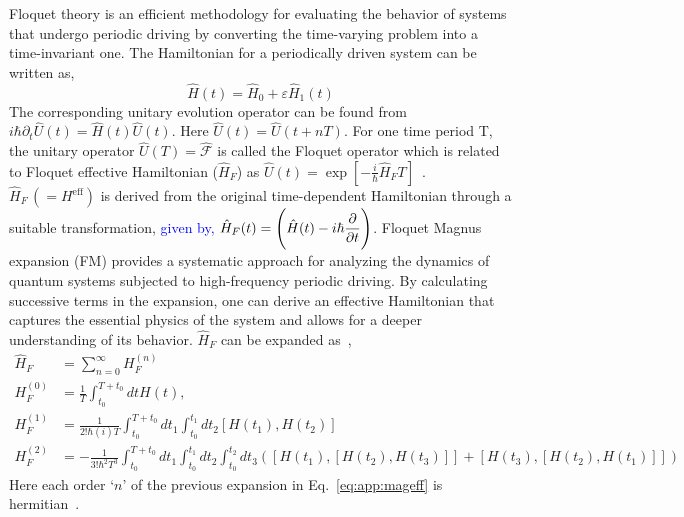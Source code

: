 \documentclass[%
reprint,
superscriptaddress,
amsmath,amssymb,showkeys,
aps,
prb,
]{revtex4-2}
\newcommand{\blue}[1]{\textcolor{blue}{#1}}
\begin{document}
	Floquet theory is an efficient methodology for evaluating the behavior of systems that undergo periodic driving by converting the time-varying problem into a time-invariant one. The Hamiltonian for a periodically driven system can be written as,
	\begin{equation*}
		\hat{H}(t) = \hat{H}_0 + \varepsilon \hat{H}_1(t)
	\end{equation*}
	The corresponding unitary evolution operator can be found from $\displaystyle{i\hbar \partial_t \hat{U}(t) = \hat{H}(t) \hat{U}(t)}$. Here $\displaystyle{\hat{U}(t) = \hat{U}(t+ nT)}$. For one time period T, the unitary operator $\displaystyle \hat{U}(T) = \hat{\mathcal{F}}$ is called the Floquet operator which is related to Floquet effective Hamiltonian ($\hat{H}_F$) as $\hat{U}(t) = \exp[-\frac{i}{\hbar}\hat{H}_F T]$~\cite{Eckardt_2015}. $\hat{H}_F\,(=H^\mathrm{eff})$ is derived from the original time-dependent Hamiltonian through a suitable transformation, \blue{given by, $\displaystyle \hat{H}_F(t) = \Bigg(\hat{H}(t) - i\hbar \pdv{t}\Bigg)$}. Floquet Magnus expansion (FM) provides a systematic approach for analyzing the dynamics of quantum systems subjected to high-frequency periodic driving. By calculating successive terms in the expansion, one can derive an effective Hamiltonian that captures the essential physics of the system and allows for a deeper understanding of its behavior. $\hat{H}_F$ can be expanded as~\cite{Sen_2021},	
	\begin{align}
		\hat{H}_F &= \sum_{n=0}^{\infty} H_F^{(n)}\nonumber\\
		H_F^{(0)} &= \frac{1}{T} \int_{t_0}^{T+t_0} dt H(t), \nonumber\\
		H_F^{(1)} &= \frac{1}{2!\hbar(i)T} \int_{t_0}^{T+t_0} dt_1  \int_{t_0}^{t_1} dt_2 [H(t_1), H(t_2)]\nonumber\\
		H_F^{(2)} &= -\frac{1}{3!\hbar^2 T^3} \int_{t_0}^{T+t_0} dt_1  \int_{t_0}^{t_1} dt_2 \int_{t_0}^{t_2} dt_3([H(t_1),[H(t_2), H(t_3)]] + [H(t_3),[H(t_2), H(t_1)]])
		\label{eq:app:mageff}
	\end{align} 
	Here each order `$n$' of the previous expansion in Eq.~\ref{eq:app:mageff} is hermitian~\cite{haldar_statistical_2022}.
	
\end{document}
